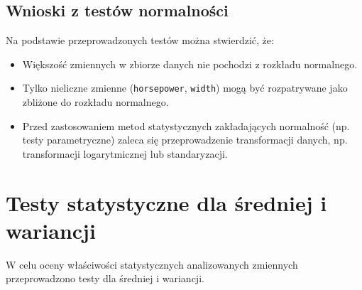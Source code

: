 \documentclass[12pt,a4paper]{article}
\begin{document}
\subsection{Wnioski z testów normalności}

Na podstawie przeprowadzonych testów można stwierdzić, że:
\begin{itemize}
    \item Większość zmiennych w zbiorze danych nie pochodzi z rozkładu normalnego.
    
    \item Tylko nieliczne zmienne (\texttt{horsepower}, \texttt{width}) mogą być rozpatrywane jako zbliżone do rozkładu normalnego.
    
    \item Przed zastosowaniem metod statystycznych zakładających normalność (np. testy parametryczne) zaleca się przeprowadzenie transformacji danych, np. transformacji logarytmicznej lub standaryzacji.
\end{itemize}

\section{Testy statystyczne dla średniej i wariancji}

W celu oceny właściwości statystycznych analizowanych zmiennych przeprowadzono testy dla średniej i wariancji.
\end{document}
